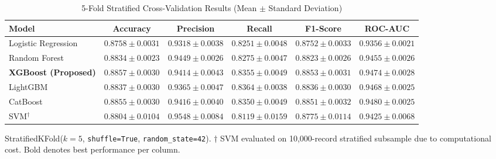 \begin{table}[!t]
  \renewcommand{\arraystretch}{1.25}
  \caption{5-Fold Stratified Cross-Validation Results (Mean $\pm$ Standard Deviation)}
  \label{tab:kfold}
  \centering
  \begin{tabular}{lccccc}
    \hline
    \textbf{Model} & \textbf{Accuracy} & \textbf{Precision} & \textbf{Recall} & \textbf{F1-Score} & \textbf{ROC-AUC} \\
    \hline
    Logistic Regression        & $0.8758 \pm 0.0031$ & $0.9318 \pm 0.0038$ & $0.8251 \pm 0.0048$ & $0.8752 \pm 0.0033$ & $0.9356 \pm 0.0021$ \\
    Random Forest              & $0.8834 \pm 0.0023$ & $0.9449 \pm 0.0026$ & $0.8275 \pm 0.0047$ & $0.8823 \pm 0.0026$ & $0.9455 \pm 0.0026$ \\
    \textbf{XGBoost (Proposed)}& $\mathbf{0.8857 \pm 0.0030}$ & $\mathbf{0.9414 \pm 0.0043}$ & $\mathbf{0.8355 \pm 0.0049}$ & $\mathbf{0.8853 \pm 0.0031}$ & $\mathbf{0.9474 \pm 0.0028}$ \\
    LightGBM                   & $0.8837 \pm 0.0030$ & $0.9365 \pm 0.0047$ & $0.8364 \pm 0.0038$ & $0.8836 \pm 0.0030$ & $0.9468 \pm 0.0025$ \\
    CatBoost                   & $0.8855 \pm 0.0030$ & $0.9416 \pm 0.0040$ & $0.8350 \pm 0.0049$ & $0.8851 \pm 0.0032$ & $0.9480 \pm 0.0025$ \\
    SVM$^{\dagger}$            & $0.8804 \pm 0.0104$ & $0.9548 \pm 0.0084$ & $0.8119 \pm 0.0159$ & $0.8775 \pm 0.0114$ & $0.9425 \pm 0.0068$ \\
    \hline
  \end{tabular}
  \vspace{1mm}
  \begin{flushleft}
    \small StratifiedKFold($k=5$, \texttt{shuffle=True}, \texttt{random\_state=42}).
    $\dagger$ SVM evaluated on 10,000-record stratified subsample due to computational cost.
    Bold denotes best performance per column.
  \end{flushleft}
\end{table}



